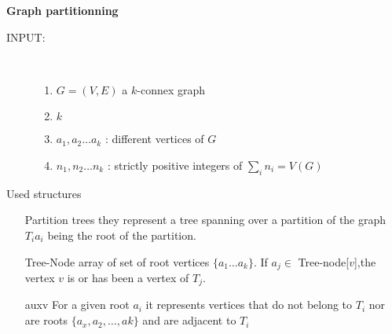 \begin{frame}

        {\bfseries Graph partitionning}\\
             \begin{description}
                \item [INPUT:] \hfill \\
                        \begin{enumerate}
                                \item $G = (V, E)$ a $k$-connex graph 
                            \item $k$
                            \item $a_1, a_2 \ldots a_k$ : different vertices of $G$
                            \item $n_1, n_2 \ldots n_k$ : strictly positive integers of $\sum_i n_i =  V(G)$
                               \end{enumerate}
        \end{description}
\end{frame}


\begin{frame}{Used structures}
\begin{itemize}
  \item[Partition trees] they represent a tree spanning over a partition of the graph $T_i  a_i$ being 
  the root of the partition.
  \item [Tree-Node] array of set of root vertices $\{a_1 \ldots a_k\}$. If $a_j \in$ Tree-node[$v$],the vertex $v$ 
  is or has been a vertex of $T_j$.
  \item [auxv] For a given root $a_i$ it represents vertices that do not belong to $T_i$ nor are roots 
  $\{a_x,a_2, \ldots ,ak\}$ and are adjacent to $T_i$ 
\end{itemize}
\end{frame}

